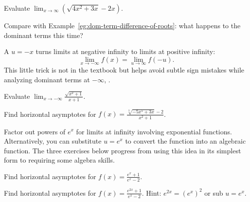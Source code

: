 \documentclass[../main.tex]{subfiles}
\begin{document}
\begin{exercise}\label{ex:dom-term-rationalize-finite}
  Evaluate \(\lim_{x \to \infty} \left( \sqrt{4x^{2} + 3x} - 2x \right)\).

  {\footnotesize Compare with Example~\ref{eg:dom-term-difference-of-roots}: what happens to the dominant terms this time?}

  \blanks*
\end{exercise}

\clearpage

\faStar{} A  \(u = -x\) turns limits at negative infinity to limits at positive infinity:
\[
  \lim_{x \to -\infty} f(x) = \lim_{u \to \infty} f(-u).
\]
This little trick is not in the textbook but helps avoid subtle sign mistakes while analyzing dominant terms at \(-\infty\), .


\begin{example}
  Evaluate \(\lim_{x \to -\infty} \frac{\sqrt{x^{2} + 1}}{x + 1}\).

\end{example}

\begin{exercise}
  Find horizontal asymptotes for \(f(x) = \frac{\sqrt[3]{-5x^{5} + 3x} - 2}{x^{2} + 1}\).

\end{exercise}
\clearpage

\label{page:limits-at-infinity-exp}
Factor out powers of \(e^{x}\) for limits at infinity involving exponential functions.  Alternatively, you can substitute \(u = e^{x}\) to convert the function into an algebraic function.  The three exercises below progress from using this idea in its simplest form to requiring some algebra skills. %

\begin{exercise}\label{ex:asymptote-exp-basic}
  Find horizontal asymptotes for \(f(x) = \frac{e^{x}+1}{e^{x}-2}\).

  \blanks*
\end{exercise}

\begin{exercise}\label{ex:asymptote-exp-squared}
  Find horizontal asymptotes for \(f(x) = \frac{e^{2x}+1}{e^{x}-2}\). Hint: \(e^{2x} = (e^{x})^{2}\) or sub \(u = e^{x}\).

  \blanks*
\end{exercise}
\clearpage
\end{document}

